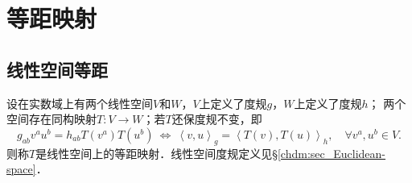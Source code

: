 \section{等距映射}\label{chrg:sec_isometry}


\subsection{线性空间等距}

\begin{definition}\label{chrg:def_isometry-VW}
设在实数域上有两个线性空间$V$和$W$，$V$上定义了度规$g$，$W$上定义了度规$h$；
两个空间存在同构映射$T:V\to W$；若$T$还保度规不变，即
\begin{equation}\label{chrg:eqn_isometry-VW}
    g_{ab}v^a u^b = h_{ab} T(v^a) T(u^b)    \ \Leftrightarrow \ 
    \left<v,u\right>_g = \left<T(v),T(u)\right>_h,
    \quad    \forall v^a, u^b \in V.
\end{equation}
则称$T$是线性空间上的{\heiti 等距映射}．线性空间度规定义见\S\ref{chdm:sec_Euclidean-space}．
\end{definition}

